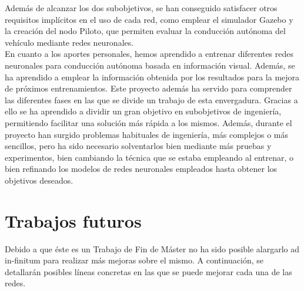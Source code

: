 Además de alcanzar los dos subobjetivos, se han conseguido satisfacer otros requisitos implícitos en el uso de cada red, como emplear el simulador Gazebo y la creación del nodo Piloto, que permiten evaluar la conducción autónoma del vehículo mediante redes neuronales.\\

En cuanto a los aportes personales, hemos aprendido a entrenar diferentes redes neuronales para conducción autónoma basada en información visual. Además, se ha aprendido a emplear la información obtenida por los resultados para la mejora de próximos entrenamientos. Este proyecto además ha servido para comprender las diferentes fases en las que se divide un trabajo de esta envergadura. Gracias a ello se ha aprendido a dividir un gran objetivo en subobjetivos de ingeniería, permitiendo facilitar una solución más rápida a los mismos. Además, durante el proyecto han surgido problemas habituales de ingeniería, más complejos o más sencillos, pero ha sido necesario solventarlos bien mediante más pruebas y experimentos, bien cambiando la técnica que se estaba empleando al entrenar, o bien refinando los modelos de redes neuronales empleados hasta obtener los objetivos deseados.\\


\section{Trabajos futuros}

Debido a que éste es un Trabajo de Fin de Máster no ha sido posible alargarlo ad in-finitum para realizar más mejoras sobre el mismo. A continuación, se detallarán posibles líneas concretas en las que se puede mejorar cada una de las redes.\\

